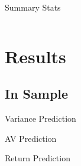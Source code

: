 \documentclass{beamer}
\begin{document}
\begin{frame}{Summary Stats}
	\begin{table}[!htbp] \centering 
		\begin{adjustbox}{width=\textwidth}
			\begin{tabular}{lcccccc} 
				
			\end{tabular}
		\end{adjustbox}
	\end{table}
\end{frame}


\section{Results}
\subsection{In Sample}

\begin{frame}{Variance Prediction}
	\vspace{-12pt}
 \begin{table}
 	\begin{adjustbox}{width=\textwidth,height=4cm}
 	
 	\end{adjustbox}

 \end{table}
\end{frame}

\begin{frame}{AV Prediction}
	\vspace{-12pt}
	\begin{table}
		\begin{adjustbox}{width=\textwidth,height=4cm}
			
		\end{adjustbox}
		
	\end{table}
\end{frame}

\begin{frame}{Return Prediction}
	\vspace{-12pt}
	\begin{table}
		\begin{adjustbox}{width=\textwidth,height=4cm}
			
		\end{adjustbox}
		
	\end{table}
\end{frame}
\end{document}
